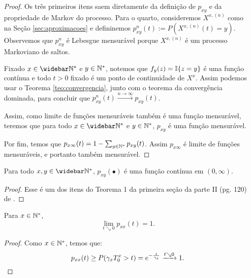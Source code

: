 \begin{proof}
  Os três primeiros itens saem diretamente da definição de $p_{x y}$ e
  da propriedade de Markov do processo. Para o quarto, consideremos
  $X^{x, (n)}$ como na Seção \ref{sec:aproximacoes} e defininemos
  $p^n_{x y}(t) := P(X^{x, (n)}(t) = y)$. Observemos que $p^n_{xy}$ é
  Lebesgue mensurável porque $X^{x, (n)}$ é um processo Markoviano de
  saltos.

  Fixado $x \in \Nzb$ e $y \in {\mathbb{N^*}}$, notemos que $f_y(z) = {\mathbb{I}}\{ z =
  y \}$ é uma função contínua e todo $t > 0$ fixado é \qc um ponto de
  continuidade de $X^x$. Assim podemos usar o Teorema
  \ref{teo:convergencia}, junto com o teorema da convergência
  dominada, para concluir que $p_{x y}^n(t) \xrightarrow{n\to\infty}
  p_{x y}(t)$.

  Assim, como limite de funções mensuráveis também é uma função
  mensurável, teremos que para todo $x \in \Nzb$ e $y \in {\mathbb{N^*}}$, $p_{x
    y}$ é uma função mensurável.

  Por fim, temos que $p_{x \infty} (t) = 1 - \sum_{y \in {\mathbb{N^*}}} p_{x y}
  (t)$. Assim $p_{x \infty}$ é limite de funções mensuráveis, e
  portanto também mensurável.
\end{proof}

\begin{proposicao}
  \label{prop:transicao-continua}
  Para todo $x, y \in \Nzb$, $p_{x y}(\bullet)$ é uma função contínua
  em $(0, \infty)$.
\end{proposicao} 

\begin{proof}
  Esse é um dos itens do Teorema 1 da primeira seção da parte II
  (pg. 120) de \cite{chung:67}.
\end{proof}

\begin{proposicao}
  \label{prop:continuidade-facil}
  Para $x \in {\mathbb{N^*}}$,
  \begin{equation}
    \lim_{t \searrow 0}p_{xx}(t) = 1.   
  \end{equation}
\end{proposicao}
\begin{proof}
  Como $x \in {\mathbb{N^*}}$, temos que:
  \begin{displaymath}
    p_{xx}(t) \geq P( \gamma_x T^x_0 > t) = e^{-\frac{t}{\gamma_x}}
    \xrightarrow{t \searrow 0} 1.
    \qedhere
  \end{displaymath}
\end{proof}



